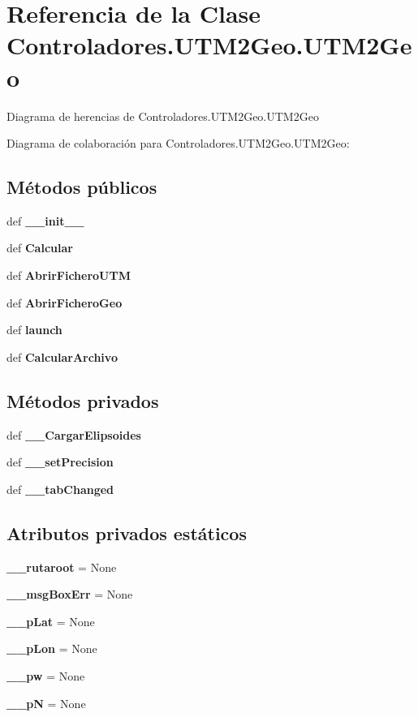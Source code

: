 \section{Referencia de la Clase Controladores.\-U\-T\-M2\-Geo.\-U\-T\-M2\-Geo}
\label{classControladores_1_1UTM2Geo_1_1UTM2Geo}


Diagrama de herencias de Controladores.\-U\-T\-M2\-Geo.\-U\-T\-M2\-Geo


Diagrama de colaboración para Controladores.\-U\-T\-M2\-Geo.\-U\-T\-M2\-Geo\-:
\subsection*{Métodos públicos}
\begin{DoxyCompactItemize}
\item 
def {\bf \-\_\-\-\_\-init\-\_\-\-\_\-}
\item 
def {\bf Calcular}
\item 
def {\bf Abrir\-Fichero\-U\-T\-M}
\item 
def {\bf Abrir\-Fichero\-Geo}
\item 
def {\bf launch}
\item 
def {\bf Calcular\-Archivo}
\end{DoxyCompactItemize}
\subsection*{Métodos privados}
\begin{DoxyCompactItemize}
\item 
def {\bf \-\_\-\-\_\-\-Cargar\-Elipsoides}
\item 
def {\bf \-\_\-\-\_\-set\-Precision}
\item 
def {\bf \-\_\-\-\_\-tab\-Changed}
\end{DoxyCompactItemize}
\subsection*{Atributos privados estáticos}
\begin{DoxyCompactItemize}
\item 
{\bf \-\_\-\-\_\-rutaroot} = None
\item 
{\bf \-\_\-\-\_\-msg\-Box\-Err} = None
\item 
{\bf \-\_\-\-\_\-p\-Lat} = None
\item 
{\bf \-\_\-\-\_\-p\-Lon} = None
\item 
{\bf \-\_\-\-\_\-pw} = None
\item 
{\bf \-\_\-\-\_\-p\-N} = None
\end{DoxyCompactItemize}


